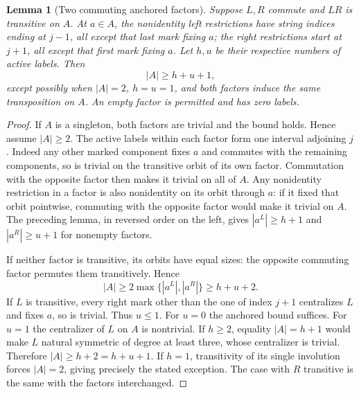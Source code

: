 \documentclass[11pt,a4paper]{article}
\newtheorem{lemma}{Lemma}
\begin{document}
\begin{lemma}[Two commuting anchored factors]
Suppose $L,R$ commute and $LR$ is transitive on $A$.
At $a\in A$, the nonidentity left restrictions have
string indices ending at $j-1$, all except that
last mark fixing $a$; the right restrictions start
at $j+1$, all except that first mark fixing $a$.
Let $h,u$ be their respective numbers of active
labels. Then
\[
 |A|\ge h+u+1,
\]
except possibly when $|A|=2$, $h=u=1$, and both
factors induce the same transposition on $A$.
An empty factor is permitted and has zero labels.
\end{lemma}
\begin{proof}
If $A$ is a singleton, both factors are trivial
and the bound holds. Hence assume $|A|\ge2$.
The active labels within each factor form one
interval adjoining $j$. Indeed any other marked
component fixes $a$ and commutes with the remaining
components, so is trivial on the transitive orbit
of its own factor. Commutation with the opposite
factor then makes it trivial on all of $A$.
Any nonidentity restriction in a factor is also
nonidentity on its orbit through $a$: if it fixed
that orbit pointwise, commuting with the opposite
factor would make it trivial on $A$.
The preceding lemma, in reversed order on the left,
gives $|a^L|\ge h+1$ and $|a^R|\ge u+1$ for
nonempty factors.

If neither factor is transitive, its orbits have
equal sizes: the opposite commuting factor
permutes them transitively. Hence
\[
 |A|\ge2\max\{|a^L|,|a^R|\}\ge h+u+2.
\]
If $L$ is transitive, every right mark other than
the one of index $j+1$ centralizes $L$ and fixes
$a$, so is trivial. Thus $u\le1$. For $u=0$ the
anchored bound suffices. For $u=1$ the centralizer
of $L$ on $A$ is nontrivial. If $h\ge2$, equality
$|A|=h+1$ would make $L$ natural symmetric of
degree at least three, whose centralizer is
trivial. Therefore $|A|\ge h+2=h+u+1$.
If $h=1$, transitivity of its single involution
forces $|A|=2$, giving precisely the stated
exception. The case with $R$ transitive is the
same with the factors interchanged.
\end{proof}
\end{document}
